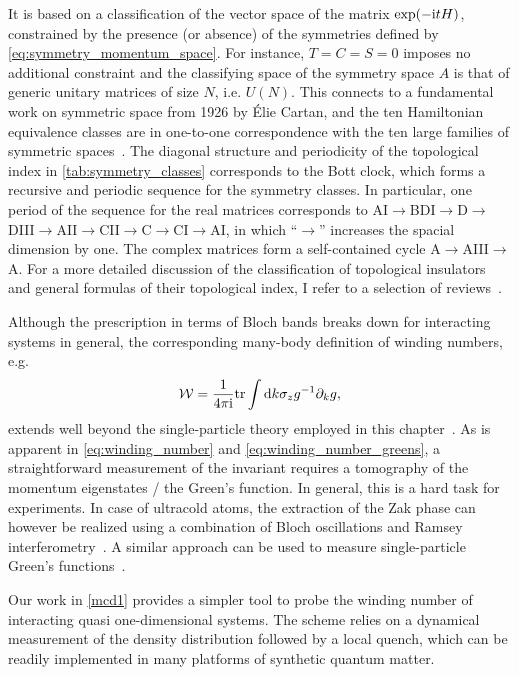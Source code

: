 It is based on a classification of the vector space of the matrix $\exp(-\mathrm i t H)$, constrained by the presence (or absence) of the symmetries defined by \cref{eq:symmetry_momentum_space}.
For instance, $T=C=S=0$ imposes no additional constraint and the classifying space of the symmetry space $A$ is that of generic unitary matrices of size $N$, i.e. $U(N)$.
This connects to a fundamental work on symmetric space from 1926 by Élie Cartan, and the ten Hamiltonian equivalence classes are in one-to-one correspondence with the ten large families of symmetric spaces~\cite{Heinzner2005}.
The diagonal structure and periodicity of the topological index in \cref{tab:symmetry_classes} corresponds to the Bott clock, which forms a recursive and periodic sequence for the symmetry classes.
In particular, one period of the sequence for the real matrices corresponds to AI$\rightarrow$BDI$\rightarrow$D$\rightarrow$DIII$\rightarrow$AII$\rightarrow$CII$\rightarrow$C$\rightarrow$CI$\rightarrow$AI, in which ``$\rightarrow$'' increases the spacial dimension by one.
The complex matrices form a self-contained cycle A$\rightarrow$AIII$\rightarrow$A.
For a more detailed discussion of the classification of topological insulators and general formulas of their topological index, I refer to a selection of reviews~\cite{Hasan2010,Chiu2016,Cooper2019}.

Although the prescription in terms of Bloch bands breaks down for interacting systems in general, the corresponding many-body definition of winding numbers, e.g.
\begin{align}
    \mathcal W = \frac{1}{4\pi\mathrm i} {\rm tr}\int\mathrm d k \sigma_z g^{-1}\partial_k g,
    \label{eq:winding_number_greens}
\end{align}
extends well beyond the single-particle theory employed in this chapter~\cite{Gurarie2011,Manmana2012}.
As is apparent in \cref{eq:winding_number} and \cref{eq:winding_number_greens}, a straightforward measurement of the invariant requires a tomography of the momentum eigenstates / the Green's function.
In general, this is a hard task for experiments.
In case of ultracold atoms, the extraction of the Zak phase can however be realized using a combination of Bloch oscillations and Ramsey interferometry~\cite{Atala2013}.
A similar approach can be used to measure single-particle Green's functions~\cite{Knap2013,Zeiher2016}.

Our work in \cref{mcd1} provides a simpler tool to probe the winding number of interacting quasi one-dimensional systems.
The scheme relies on a dynamical measurement of the density distribution followed by a local quench, which can be readily implemented in many platforms of synthetic quantum matter.
